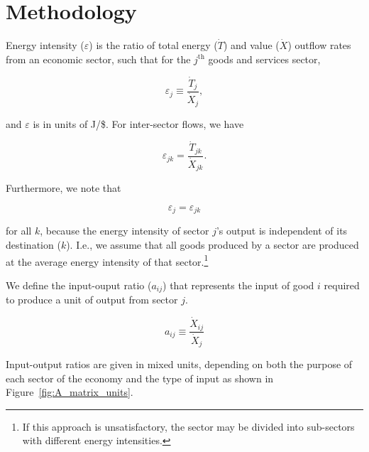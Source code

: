 \section{Methodology}

Energy intensity ($\varepsilon$)
is the ratio 
of total energy ($\dot{T}$) 
and value ($\dot{X}$) outflow rates 
from an economic sector, 
such that for the $j^{\mathrm{th}}$ goods and services sector,

\begin{equation} \label{eq:epsilon_output_def_g_and_s}
	\varepsilon_{j} \equiv \frac{\dot{T}_{j}}{\dot{X}_{j}},
\end{equation} 

\noindent{}and $\varepsilon$ is in units of J/\$. 
For inter-sector flows, we have

\begin{equation} \label{eq:epsilon_transfers_1}
	\varepsilon_{jk} = \frac{\dot{T}_{jk}}{\dot{X}_{jk}}.
\end{equation}

Furthermore, we note that 

\begin{equation} \label{eq:epsilon_equiv_1}
	\varepsilon_{j} = \varepsilon_{jk}
\end{equation}

\noindent{}for all $k$, because the energy intensity 
of sector $j$'s output is independent of its destination ($k$). 
I.e., we assume that all goods produced by a sector 
are produced at the average energy intensity 
of that sector.\footnote{If this approach is unsatisfactory, 
the sector may be divided into sub-sectors 
with different energy intensities.}

We define the input-ouput ratio ($a_{ij}$)
that represents the input 
of good $i$ required to produce a unit of output from sector $j$.

\begin{equation} \label{eq:aij_def}
	a_{ij} \equiv \frac{\dot{X}_{ij}}{\dot{X}_{j}}
\end{equation}

Input-output ratios are given in mixed units, 
depending on both the purpose of each sector of the economy 
and the type of input as shown in Figure~\ref{fig:A_matrix_units}.

